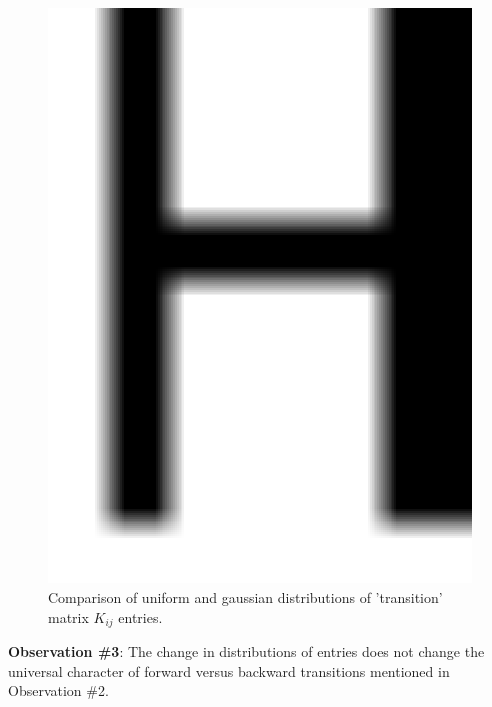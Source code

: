 \documentclass[a0]{sciposter}
\begin{document}
\begin{multicols}{3}
\begin{flushleft}
\begin{minipage}[b]{23.0cm}
\centering
\begin{figure}[ht!]
\includegraphics[width=23cm]{Figure5.eps} \caption{Comparison of uniform and gaussian distributions of 'transition' matrix $K_{ij}$ entries.}
\label{Fig2} 
\end{figure}
\end{minipage}
\vspace{-0.5cm} 

\begin{tcolorbox}[colframe=green!500!white,colback=white!50!white,boxrule=3pt]
\textbf{Observation \#3}: The change in distributions of entries does not change the universal character of forward versus backward transitions mentioned in Observation \#2.
\end{tcolorbox}
\vspace{2.8cm}
\begin{displaymath}
\end{displaymath}
\end{flushleft}
\columnbreak


\end{multicols}
\end{document}
